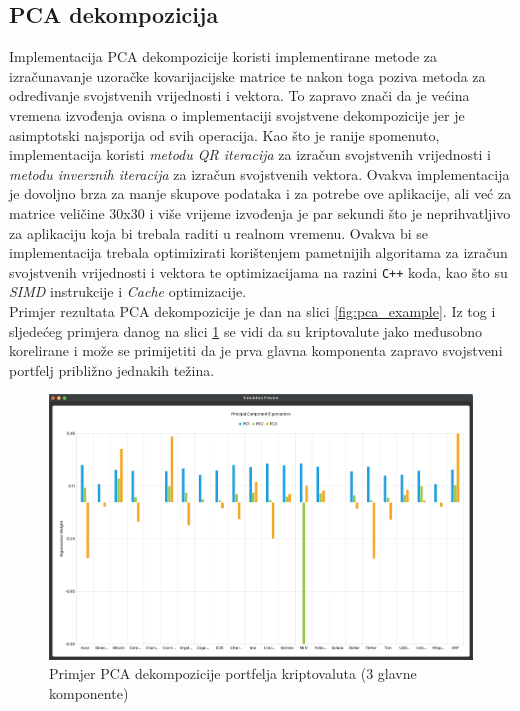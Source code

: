 \documentclass[zavrsnirad, upload]{fer}
\begin{document}
\subsection{PCA dekompozicija}
\label{sek:pca_rezultati}

Implementacija PCA dekompozicije koristi implementirane metode
za izračunavanje uzoračke kovarijacijske matrice te nakon toga poziva
metoda za određivanje svojstvenih vrijednosti i vektora. To zapravo znači
da je većina vremena izvođenja ovisna o implementaciji svojstvene dekompozicije
jer je asimptotski najsporija od svih operacija. Kao što je ranije spomenuto,
implementacija koristi \emph{metodu QR iteracija} za izračun svojstvenih
vrijednosti
i \emph{metodu inverznih iteracija} za izračun svojstvenih vektora.
Ovakva implementacija je dovoljno brza za manje skupove podataka i za
potrebe ove aplikacije, ali već za matrice veličine 30x30 i više
vrijeme izvođenja je par sekundi što je neprihvatljivo za
aplikaciju koja bi trebala raditi u realnom vremenu. Ovakva bi se
implementacija trebala optimizirati korištenjem pametnijih algoritama
za izračun svojstvenih vrijednosti i vektora te optimizacijama na
razini \texttt{C++} koda, kao što su \emph{SIMD} instrukcije i \emph{Cache}
optimizacije.\\
Primjer rezultata PCA dekompozicije je dan na slici \ref{fig:pca_example}.
Iz tog i sljedećeg primjera danog na slici \ref{fig:pca_example2}
se vidi da su kriptovalute jako međusobno korelirane i može se primijetiti
da je prva glavna komponenta zapravo svojstveni portfelj približno
jednakih težina.
\begin{figure}[H]
    \centering
    \includegraphics[width=1.0\textwidth]{Figures/pca_example2.png}
    \caption{Primjer PCA dekompozicije portfelja kriptovaluta (3 glavne komponente)}
    \label{fig:pca_example2}
\end{figure}
\end{document}
